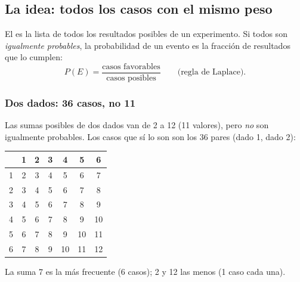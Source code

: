 

\subsection{La idea: todos los casos con el mismo peso}
El  es la lista de todos los resultados posibles de un experimento. Si todos son
\emph{igualmente probables}, la probabilidad de un evento es la fracción de resultados que lo cumplen:
\[P(E) = \frac{\text{casos favorables}}{\text{casos posibles}}\qquad\text{(regla de Laplace).}\]

\subsubsection{Dos dados: 36 casos, no 11}
Las sumas posibles de dos dados van de 2 a 12 (11 valores), pero \emph{no} son igualmente probables. Los casos que sí lo
son son los 36 pares (dado 1, dado 2):

\begin{center}\small
\begin{tabular}{c|cccccc}
 & 1 & 2 & 3 & 4 & 5 & 6\\\hline
1 & 2 & 3 & 4 & 5 & 6 & 7\\
2 & 3 & 4 & 5 & 6 & 7 & \cellcolor{zlime!50}8\\
3 & 4 & 5 & 6 & 7 & \cellcolor{zlime!50}8 & 9\\
4 & 5 & 6 & 7 & \cellcolor{zlime!50}8 & 9 & 10\\
5 & 6 & 7 & \cellcolor{zlime!50}8 & 9 & 10 & 11\\
6 & 7 & \cellcolor{zlime!50}8 & 9 & 10 & 11 & 12\\
\end{tabular}
\end{center}

La suma 7 es la más frecuente (6 casos); 2 y 12 las menos (1 caso cada una).

